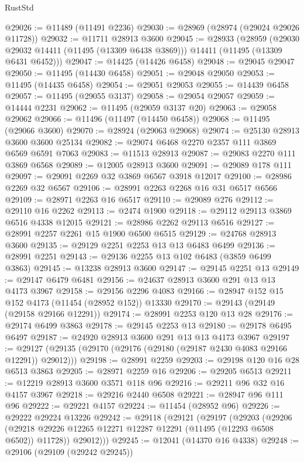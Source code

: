 \begin{lexlean}{RustStd}
\begin{coremodule}
@29026 := @11489 (@11491 @2236)
@29030 := @28969 (@28974 (@29024 @29026 @11728))
@29032 := @11711 @28913 @3600
@29045 := @28933
    (@28959
      (@29030 @29032 @14411 (@11495 (@13309 @6438 @3869)))
      @14411
      (@11495 (@13309 @6431 @6452)))
@29047 := @14425 (@14426 @6458)
@29048 := @29045 @29047
@29050 := @11495 (@14430 @6458)
@29051 := @29048 @29050
@29053 := @11495 (@14435 @6458)
@29054 := @29051 @29053
@29055 := @14439 @6458
@29057 := @11495 (@29055 @3137)
@29058 := @29054 @29057
@29059 := @14444 @2231
@29062 := @11495 (@29059 @3137 @20)
@29063 := @29058 @29062
@29066 := @11496 (@11497 (@14450 @6458))
@29068 := @11495 (@29066 @3600)
@29070 := @28924 (@29063 @29068)
@29074 := @25130 @28913 @3600 @3600 @25134
@29082 := @29074 @6468 @2270 @2357 @111 @3869 @6569 @6591 @7063
@29083 := @11513 @28913
@29087 := @29083 @2270 @111 @3869 @6568
@29089 := @12005 @28913 @3600
@29091 := @29089 @178 @111
@29097 := @29091 @2269 @32 @3869 @6567 @3918 @12017
@29100 := @28986 @2269 @32 @6567
@29106 := @28991 @2263 @2268 @16 @31 @6517 @6566
@29109 := @28971 @2263 @16 @6517
@29110 := @29089 @276
@29112 := @29110 @16 @2262
@29113 := @2474 @1900
@29118 := @29112 @29113 @3869 @6516 @4338 @12015
@29121 := @28986 @2262 @29113 @6516
@29127 := @28991 @2257 @2261 @15 @1900 @6500 @6515
@29129 := @24768 @28913 @3600
@29135 := @29129 @2251 @2253 @13 @13 @6483 @6499
@29136 := @28991 @2251
@29143 := @29136 @2255 @13 @102 @6483 (@3859 @6499 @3863)
@29145 := @13238 @28913 @3600
@29147 := @29145 @2251 @13
@29149 := @29147 @6479 @6481
@29156 := @24637 @28913 @3600 @291 @13 @13 @4173 @3967
@29158 := @29156 @2296 @4083
@29166 := @28947 @152 @15 @152 @4173 (@11454 (@28952 @152)) @13330
@29170 := @29143 (@29149 (@29158 @29166 @12291))
@29174 := @28991 @2253 @120 @13 @28
@29176 := @29174 @6499 @3863
@29178 := @29145 @2253 @13
@29180 := @29178 @6495 @6497
@29187 := @24920 @28913 @3600 @291 @13 @13 @4173 @3967
@29197 := @29127 (@29135 (@29170 (@29176 (@29180 (@29187 @2430 @4083 @29166 @12291)) @29012)))
@29198 := @28991 @2259
@29203 := @29198 @120 @16 @28 @6513 @3863
@29205 := @28971 @2259 @16
@29206 := @29205 @6513
@29211 := @12219 @28913 @3600 @3571 @118 @96
@29216 := @29211 @96 @32 @16 @4157 @3967
@29218 := @29216 @2440 @6508
@29221 := @28947 @96 @111 @96
@29222 := @29221 @4157
@29224 := @11454 (@28952 @96)
@29226 := @29222 @29224 @13226
@29242 := @29118
    (@29121
      (@29197
        (@29203
          (@29206 (@29218 @29226 @12265 @12271 @12287 @12291 (@11495 (@12293 @6508 @6502)) @11728))
          @29012)))
@29245 := @12041 (@14370 @16 @4338)
@29248 := @29106 (@29109 (@29242 @29245))

\end{coremodule}
\end{lexlean}
